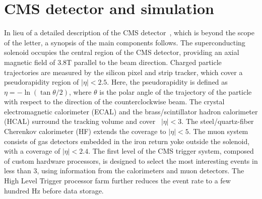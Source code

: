 \documentclass[12pt,twoside,a4paper,cmspaper,final,collab]{cms-tdr}
\begin{document}
\section{CMS detector and simulation}
\label{sec:cms}
In lieu of a detailed description of the CMS detector~\cite{CMSdetector},
which is beyond the scope of the letter, a synopsis of the main components follows.
The superconducting solenoid occupies the
central region of the CMS detector, providing an axial magnetic
field of 3.8\unit{T} parallel to the beam direction. Charged particle trajectories
are measured by the silicon pixel and strip tracker, which cover a
pseudorapidity region of $|\eta| < 2.5$. Here, the pseudorapidity is defined as
$\eta=-\ln{(\tan{\theta/2})}$, where $\theta$ is the polar angle of the trajectory of the particle
with respect to the direction of the counterclockwise beam. The crystal electromagnetic
calorimeter (ECAL) and the brass/scintillator hadron calorimeter (HCAL)
surround the tracking volume and cover \mbox{ $|\eta| < 3$}. The steel/quartz-fiber
Cherenkov calorimeter (HF) extends the coverage to $|\eta| < 5$. The muon system consists of
gas detectors embedded in the iron return yoke outside the solenoid, with a coverage of $|\eta| < 2.4$.
The first level of the CMS trigger system, composed of custom
hardware processors, is designed to select the most interesting events
in less than 3\mus, using information from the calorimeters and muon
detectors. The High Level Trigger processor farm further
reduces the event rate to a few hundred Hz before data storage.
\end{document}
